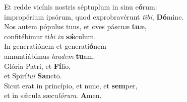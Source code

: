 \oddverse Et redde vicínis nostris séptuplum in sinu e\textbf{ó}rum:~\*\\
\oddverse impropérium ipsórum, quod exprobravérunt \textit{ti}\textit{bi}, \textbf{Dó}mine.\\
\evenverse Nos autem pópulus tuus, et oves páscuæ \textbf{tu}æ,~\*\\
\evenverse confitébimur ti\textit{bi} \textit{in} \textbf{sǽ}culum.\\
\oddverse In generatiónem et generati\textbf{ó}nem~\*\\
\oddverse annuntiábimus \textit{lau}\textit{dem} \textbf{tu}am.\\
\evenverse Glória Patri, et \textbf{Fí}lio,~\*\\
\evenverse et Spirí\textit{tu}\textit{i} \textbf{San}cto.\\
\oddverse Sicut erat in princípio, et nunc, et \textbf{sem}per,~\*\\
\oddverse et in sǽcula sæcu\textit{ló}\textit{rum}. \textbf{A}men.\\
